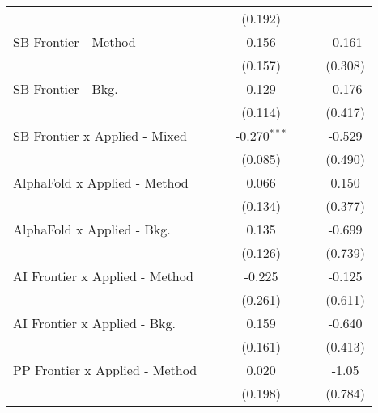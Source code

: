 \begin{tabular}{lcccccc}
                                  &               &             & (0.192)        &               &         &   \\   
   SB Frontier - Method           &               &             & 0.156          &               &         & -0.161\\   
                                  &               &             & (0.157)        &               &         & (0.308)\\   
   SB Frontier - Bkg.             &               &             & 0.129          &               &         & -0.176\\   
                                  &               &             & (0.114)        &               &         & (0.417)\\   
   SB Frontier x Applied - Mixed  &               &             & -0.270$^{***}$ &               &         & -0.529\\   
                                  &               &             & (0.085)        &               &         & (0.490)\\   
   AlphaFold x Applied - Method   &               &             & 0.066          &               &         & 0.150\\   
                                  &               &             & (0.134)        &               &         & (0.377)\\   
   AlphaFold x Applied - Bkg.     &               &             & 0.135          &               &         & -0.699\\   
                                  &               &             & (0.126)        &               &         & (0.739)\\   
   AI Frontier x Applied - Method &               &             & -0.225         &               &         & -0.125\\   
                                  &               &             & (0.261)        &               &         & (0.611)\\   
   AI Frontier x Applied - Bkg.   &               &             & 0.159          &               &         & -0.640\\   
                                  &               &             & (0.161)        &               &         & (0.413)\\   
   PP Frontier x Applied - Method &               &             & 0.020          &               &         & -1.05\\   
                                  &               &             & (0.198)        &               &         & (0.784)\\   

\end{tabular}

